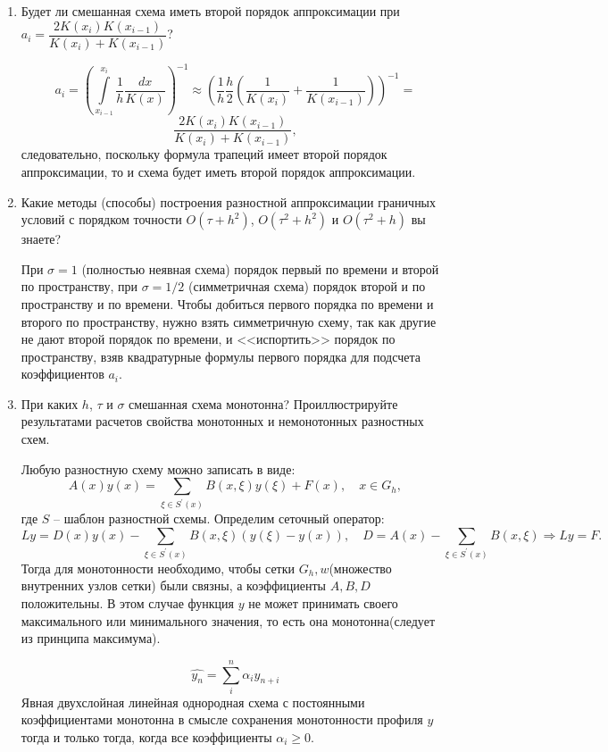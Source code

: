 \documentclass[12pt, a4paper]{article}
\begin{document}
\begin{enumerate}
\item Будет ли смешанная схема иметь второй порядок аппроксимации при $a_i = \dfrac{2 K(x_i)K(x_{i-1})}{K(x_i) + K(x_{i-1})}$?

\[
a_i = \left(\int\limits_{x_{i-1}}^{x_{i}}{\dfrac{1}{h}\dfrac{dx}{K(x)}}\right)^{-1} \approx \left(\dfrac{1}{h}\dfrac{h}{2}\left(\dfrac{1}{K(x_{i})} + \dfrac{1}{K(x_{i-1})}\right)\right)^{-1} = 
\]
\[
\dfrac{2 K(x_i)K(x_{i-1})}{K(x_i) + K(x_{i-1})},
\]
следовательно, поскольку формула трапеций имеет второй порядок аппроксимации, то и схема будет иметь второй порядок аппроксимации. 

\item Какие методы (способы) построения разностной аппроксимации граничных условий с порядком точности $O(\tau + h^2)$, $O(\tau^2 +h^2)$ и $O(\tau^2 + h)$ вы знаете?

При $\sigma = 1$ (полностью неявная схема) порядок первый по времени и второй по пространству, при $\sigma  = 1/2$ (симметричная схема) порядок второй и по пространству и по времени. Чтобы добиться первого порядка по времени и второго по пространству, нужно взять симметричную схему, так как другие не дают второй порядок по времени, и <<испортить>> порядок по пространству, взяв квадратурные формулы первого порядка для подсчета коэффициентов $a_i$.

\item При каких $h$, $\tau$ и $\sigma$ смешанная схема монотонна? Проиллюстрируйте результатами расчетов свойства монотонных и немонотонных разностных схем.

Любую разностную схему можно записать в виде:
\[
  A(x)y(x) = \displaystyle\sum_{\xi \in S^'(x)} B(x, \xi)y(\xi) + F(x), \quad x\in G_h,
\]
\noindent где $S$ -- шаблон разностной схемы. Определим сеточный оператор:
\[
  Ly = D(x)y(x) - \displaystyle\sum_{\xi \in S^'(x)} B(x, \xi)(y(\xi) - y(x)), \quad D = A(x) - \displaystyle\sum_{\xi \in S^'(x)} B(x, \xi) \Rightarrow Ly = F.
\]
Тогда для монотонности необходимо, чтобы сетки $G_h, w$(множество внутренних узлов сетки) были связны, а коэффициенты $A, B, D$ положительны. В этом случае функция $y$ не может принимать своего максимального или минимального значения, то есть она монотонна(следует из принципа максимума).

\[
\hat{y_n} = \sum_{i}^{n}{\alpha_i y_{n+i}}
\]
Явная двухслойная линейная однородная схема с постоянными коэффициентами монотонна в смысле сохранения монотонности профиля $y$ тогда и только тогда, когда все коэффициенты $\alpha_i \geq 0$.


\end{enumerate}
\end{document}
